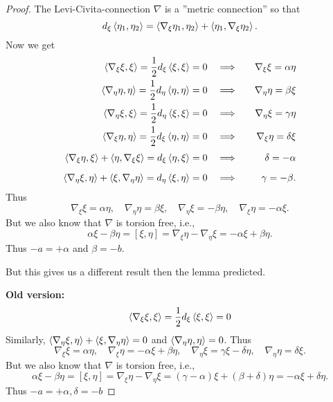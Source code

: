\begin{proof}
	
	The Levi-Civita-connection $ \nabla $ is a ''metric connection'' so that 
		\[ d_\xi\left \langle \eta_1,\eta_2 \right\rangle = \left \langle \nabla_\xi \eta_1,\eta_2 \right\rangle +\left \langle \eta_1,\nabla_\xi \eta_2 \right\rangle. \]
	Now we get
	\begin{align*}
		\left \langle \nabla_\xi \xi,\xi \right\rangle = \dfrac{1}{2} d_\xi\left \langle \xi,\xi \right\rangle = 0 
			&&& \Longrightarrow &&& \nabla_\xi\xi = \alpha\eta\\
		\left \langle \nabla_\eta \eta,\eta \right\rangle = \dfrac{1}{2} d_\eta\left \langle \eta,\eta \right\rangle = 0 
			&&& \Longrightarrow &&& \nabla_\eta \eta  = \beta \xi \\
		\left \langle \nabla_\eta \xi, \xi \right\rangle = \frac 12 d_\eta \left \langle \xi,\xi \right\rangle = 0 
			&&& \Longrightarrow &&& \nabla_\eta \xi  = \gamma \eta \\
		\left \langle \nabla_\xi \eta, \eta \right\rangle = \frac 12 d_\xi \left \langle \eta,\eta \right\rangle = 0 
			&&& \Longrightarrow &&& \nabla_\xi \eta  = \delta \xi \\[1mm]
		\left \langle \nabla_\xi \eta,\xi \right\rangle + \left \langle \eta,\nabla_\xi \xi \right\rangle = d_\xi\left \langle \eta,\xi \right\rangle = 0
			&&& \Longrightarrow &&&  \delta =- \alpha \\[2mm]
		\left \langle \nabla_\eta \xi,\eta \right\rangle + \left \langle \xi,\nabla_\eta \eta \right\rangle = d_\eta\left \langle \xi,\eta \right\rangle = 0
			&&& \Longrightarrow &&&  \gamma =- \beta. \\
	\end{align*}
	Thus 
	\[ \nabla_\xi \xi = \alpha \eta, \quad \nabla_\eta \eta = \beta \xi, \quad \nabla_\eta \xi =  -\beta\eta, \quad \nabla_\xi \eta = -\alpha \xi. \]
	But we also know that $ \nabla $ is torsion free, i.e.,
	\[ \alpha \xi - \beta \eta  = [\xi,\eta] = \nabla_\xi \eta - \nabla_\eta \xi = - \alpha\xi + \beta \eta. \]
	Thus $ -a = +  \alpha$ and $ \beta = -b $.
	
	But this gives us a different result then the lemma predicted.
	
	\textbf{Old version:}
		\[\left \langle \nabla_\xi \xi,\xi \right\rangle = \dfrac{1}{2} d_\xi\left \langle \xi,\xi \right\rangle = 0 \]
	Similarly, $ \left \langle \nabla_\eta \xi,\eta \right\rangle + \left \langle \xi,\nabla_\eta \eta \right\rangle = 0  $ and $ \left \langle \nabla_\eta \eta,\eta \right\rangle = 0 $.
	Thus 
		\[ \nabla_\xi \xi = \alpha \eta, \quad \nabla_\xi \eta = -\alpha \xi + \beta \eta, \quad \nabla_\eta \xi =  \gamma\xi - \delta \eta, \quad \nabla_\eta \eta = \delta \xi. \]
	But we also know that $ \nabla $ is torsion free, i.e.,
		\[ \alpha \xi - \beta \eta  = [\xi,\eta] = \nabla_\xi \eta - \nabla_\eta \xi = (\gamma - \alpha)\xi + (\beta + \delta)\eta = - \alpha \xi + \delta \eta. \]
	Thus $ -a = +  \alpha, \delta = -b $
		 	
\end{proof}

